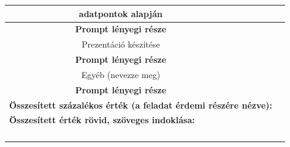 {\begin{tabular}{|c|c|c|c|}
		adatpontok alapján & & & \\ \hline
		\textbf{Prompt lényegi része}  &\multicolumn{3}{|l|}{} \\ \hline \hline
		Prezentáció készítése & & & \\ \hline
		\textbf{Prompt lényegi része}  &\multicolumn{3}{|l|}{} \\ \hline \hline
		Egyéb (nevezze meg) & & & \\ \hline
		\textbf{Prompt lényegi része}  &\multicolumn{3}{|l|}{} \\ \hline
		\multicolumn{3}{|l|}{\textbf{Összesített százalékos érték (a feladat érdemi részére nézve):}} & \\ \hline
		\multicolumn{4}{|l|}{\textbf{Összesített érték rövid, szöveges indoklása:}} \\ 
		\multicolumn{4}{|l|}{} \\ 
		\multicolumn{4}{|l|}{} \\
		\multicolumn{4}{|l|}{} \\
		\multicolumn{4}{|l|}{} \\ \hline
		
	\end{tabular}
} %


